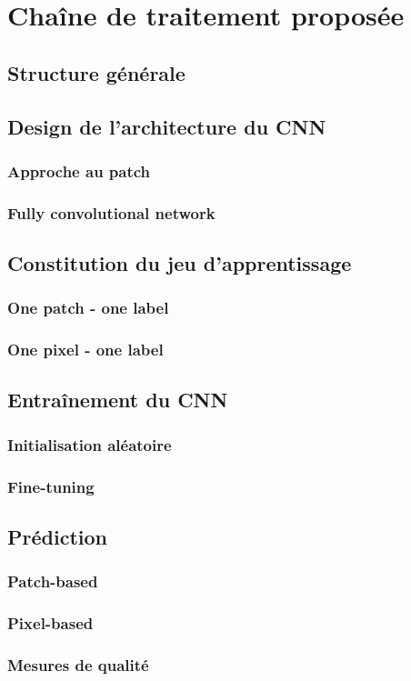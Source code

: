 
\chapter{Cha\^ine de traitement propos\'ee} %
\PartialToc
\label{Chapter3} %


\section{Structure g\'en\'erale}
\section{Design de l'architecture du CNN}
\subsection{Approche au patch}
\subsection{\og Fully convolutional network\fg{}}
\section{Constitution du jeu d'apprentissage}
\subsection{\og One patch - one label\fg{}}
\subsection{\og One pixel - one label\fg{}}
\section{Entra\^inement du CNN}
\subsection{Initialisation al\'eatoire}
\subsection{Fine-tuning}
\section{Pr\'ediction}
\subsection{Patch-based}
\subsection{Pixel-based}
\subsection{Mesures de qualit\'e}